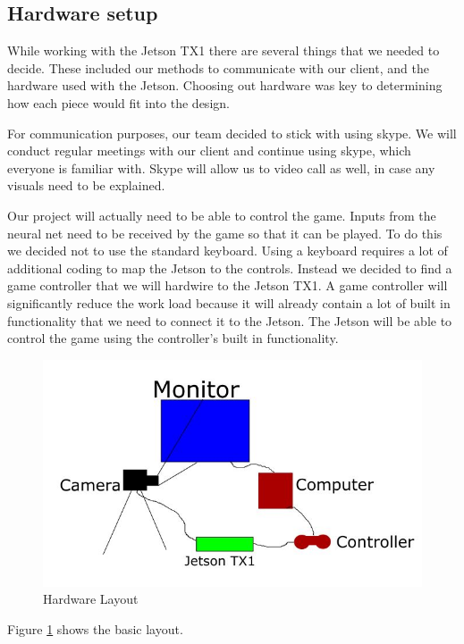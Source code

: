 \documentclass{scrreprt}
\begin{document}
\subsection{Hardware setup}%

While working with the Jetson TX1 there are several things that we needed to decide.
These included our methods to communicate with our client, and the hardware used with the Jetson.
Choosing out hardware was key to determining how each piece would fit into the design.

For communication purposes, our team decided to stick with using skype.
We will conduct regular meetings with our client and continue using skype, which everyone is familiar with.
Skype will allow us to video call as well, in case any visuals need to be explained.

Our project will actually need to be able to control the game.
Inputs from the neural net need to be received by the game so that it can be played.
To do this we decided not to use the standard keyboard.
Using a keyboard requires a lot of additional coding to map the Jetson to the controls.
Instead we decided to find a game controller that we will hardwire to the Jetson TX1.
A game controller will significantly reduce the work load because it will already contain a lot of built in functionality that we need to connect it to the Jetson.
The Jetson will be able to control the game using the controller's built in functionality.

\begin{figure}
  \includegraphics[natwidth=100,natheight=200]{design.JPG}
  \caption{Hardware Layout}
  \label{fig:design1}
\end{figure}
Figure \ref{fig:design1} shows the basic layout.
\end{document}

